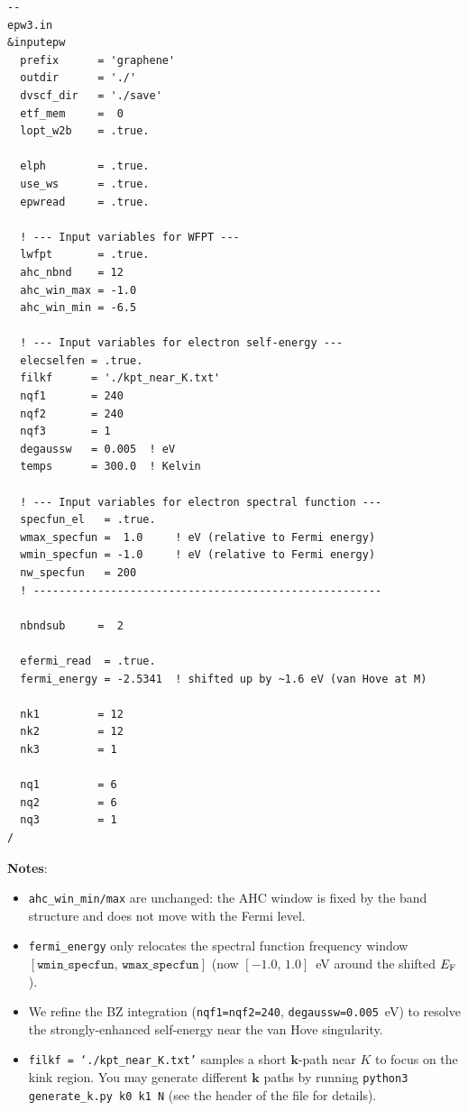 \documentclass[a4paper,11pt,serif]{article}
\newcommand{\mb}[1]{\mathbf{#1}}
\begin{document}
\begin{scriptsize}
\begin{Verbatim}[frame=single]
--                                                                                                 epw3.in
&inputepw
  prefix      = 'graphene'
  outdir      = './'
  dvscf_dir   = './save'
  etf_mem     =  0
  lopt_w2b    = .true.

  elph        = .true.
  use_ws      = .true.
  epwread     = .true.

  ! --- Input variables for WFPT ---
  lwfpt       = .true.
  ahc_nbnd    = 12
  ahc_win_max = -1.0
  ahc_win_min = -6.5

  ! --- Input variables for electron self-energy ---
  elecselfen = .true.
  filkf      = './kpt_near_K.txt'
  nqf1       = 240
  nqf2       = 240
  nqf3       = 1
  degaussw   = 0.005  ! eV
  temps      = 300.0  ! Kelvin

  ! --- Input variables for electron spectral function ---
  specfun_el   = .true.
  wmax_specfun =  1.0     ! eV (relative to Fermi energy)
  wmin_specfun = -1.0     ! eV (relative to Fermi energy)
  nw_specfun   = 200
  ! ------------------------------------------------------

  nbndsub     =  2

  efermi_read  = .true.
  fermi_energy = -2.5341  ! shifted up by ~1.6 eV (van Hove at M)

  nk1         = 12
  nk2         = 12
  nk3         = 1

  nq1         = 6
  nq2         = 6
  nq3         = 1
/
\end{Verbatim}
\end{scriptsize}

\begin{footnotesize}
   {\bf Notes}:
   \begin{itemize}
      \item \texttt{ahc\_win\_min/max} are unchanged: the AHC window is fixed by the band structure and does not move with the Fermi level.
      \item \texttt{fermi\_energy} only relocates the spectral function frequency window $[\texttt{wmin\_specfun},\,\texttt{wmax\_specfun}]$ (now $[-1.0,\,1.0]$~eV around the shifted $E_{\rm F}$).
      \item We refine the BZ integration (\texttt{nqf1=nqf2=240}, \texttt{degaussw=0.005}~eV) to resolve the strongly-enhanced self-energy near the van Hove singularity.
      \item \texttt{filkf = `./kpt\_near\_K.txt'} samples a short $\mb{k}$-path near $K$ to focus on the kink region. You may generate different $\mb{k}$ paths by running \texttt{python3 generate\_k.py k0 k1 N} (see the header of the file for details).
   \end{itemize}
\end{footnotesize}
\end{document}
